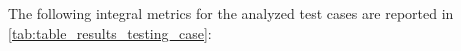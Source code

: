 \documentclass[letterpaper]{physor2026}
\begin{document}

The following integral metrics for the analyzed test cases are reported in \cref{tab:table_results_testing_case}: 

\end{document}
